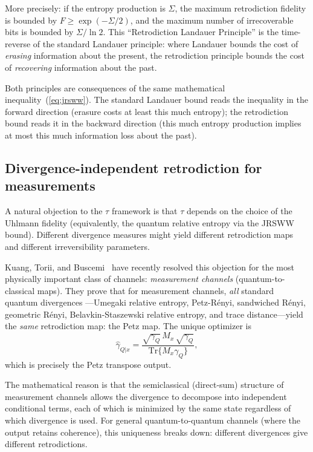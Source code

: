 \documentclass[12pt]{article}
\theoremstyle{definition}
\theoremstyle{remark}
\newcommand{\Tr}{\mathrm{Tr}}
\newcommand{\tauasym}{\tau}
\begin{document}
More precisely: if the entropy production is $\Sigma$, the
maximum retrodiction fidelity is bounded by
$F \geq \exp(-\Sigma/2)$, and the maximum number of
irrecoverable bits is bounded by $\Sigma / \ln 2$.
This ``Retrodiction Landauer Principle'' is the time-reverse of
the standard Landauer principle: where Landauer bounds the cost
of \emph{erasing} information about the present, the retrodiction
principle bounds the cost of \emph{recovering} information about
the past.

Both principles are consequences of the same mathematical
inequality~(\ref{eq:jrsww}).  The standard Landauer bound
reads the inequality in the forward direction (erasure costs
at least this much entropy); the retrodiction bound reads
it in the backward direction (this much entropy production
implies at most this much information loss about the past).

\subsection{Divergence-independent retrodiction for measurements}

A natural objection to the $\tauasym$ framework is that $\tauasym$
depends on the choice of the Uhlmann fidelity (equivalently, the
quantum relative entropy via the JRSWW bound).  Different divergence
measures might yield different retrodiction maps and different
irreversibility parameters.

Kuang, Torii, and Buscemi~\cite{Kuang2025} have recently resolved
this objection for the most physically important class of channels:
\emph{measurement channels} (quantum-to-classical maps).  They prove
that for measurement channels, \emph{all} standard quantum divergences
---Umegaki relative entropy, Petz-R\'enyi, sandwiched R\'enyi,
geometric R\'enyi, Belavkin-Staszewski relative entropy, and trace
distance---yield the \emph{same} retrodiction map: the Petz map.
The unique optimizer is
\begin{equation}
\hat{\gamma}_{Q|x} = \frac{\sqrt{\gamma_Q}\, M_x\, \sqrt{\gamma_Q}}
{\Tr\{M_x \gamma_Q\}},
\label{eq:kuang}
\end{equation}
which is precisely the Petz transpose output.

The mathematical reason is that the semiclassical (direct-sum)
structure of measurement channels allows the divergence to
decompose into independent conditional terms, each of which is
minimized by the same state regardless of which divergence is used.
For general quantum-to-quantum channels (where the output retains
coherence), this uniqueness breaks down: different divergences give
different retrodictions.
\end{document}
